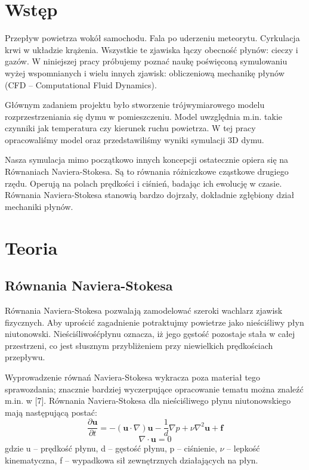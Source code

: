 \documentclass{article}
\begin{document}
    \section{Wstęp}
    Przepływ powietrza wokół samochodu. Fala po uderzeniu meteorytu. Cyrkulacja krwi w układzie krążenia. Wszystkie te zjawiska łączy obecność płynów: cieczy i gazów. W niniejszej pracy próbujemy poznać naukę poświęconą symulowaniu wyżej wspomnianych i wielu innych zjawisk: obliczeniową mechanikę płynów (CFD – Computational Fluid Dynamics).

    
    \medskip
    \noindent Głównym zadaniem projektu było stworzenie trójwymiarowego modelu rozprzestrzeniania się dymu w pomieszczeniu. Model uwzględnia m.in. takie czynniki jak temperatura czy kierunek ruchu powietrza. W tej pracy opracowaliśmy model oraz przedstawiliśmy wyniki symulacji 3D dymu.
    
    \medskip
    \noindent Nasza symulacja mimo początkowo innych koncepcji ostatecznie opiera się na Równaniach Naviera-Stokesa. Są to równania różniczkowe cząstkowe drugiego rzędu. Operują na polach prędkości i ciśnień, badając ich ewolucję w czasie. Równania Naviera-Stokesa stanowią bardzo dojrzały, dokładnie zgłębiony dział mechaniki płynów.
    
    \section{Teoria}
    \subsection{Równania Naviera-Stokesa}
        Równania Naviera-Stokesa pozwalają zamodelować szeroki wachlarz zjawisk fizycznych. Aby uprościć zagadnienie potraktujmy powietrze jako nieściśliwy płyn niutonowski. Nieściśliwośćpłynu oznacza, iż jego gęstość pozostaje stała w całej przestrzeni, co jest słusznym przybliżeniem przy niewielkich prędkościach przepływu.
        
        \medskip
        \noindent Wyprowadzenie równań Naviera-Stokesa wykracza poza materiał tego sprawozdania; znacznie bardziej wyczerpujące opracowanie tematu można znaleźć m.in. w [7]. Równania Naviera-Stokesa dla nieściśliwego płynu niutonowskiego mają następującą postać:
$$
\frac{\partial \mathbf{u}}{\partial t} =-(\mathbf{u} \cdot \nabla) \mathbf{u}-\frac{1}{d} \nabla p+\nu \nabla^{2} \mathbf{u}+\mathbf{f} 
$$
$$
\nabla \cdot \mathbf{u} =0
$$
gdzie u – prędkość płynu, d – gęstość płynu, p – ciśnienie, $\nu$ – lepkość kinematyczna, f – wypadkowa sił zewnętrznych działających na płyn.
\end{document}
